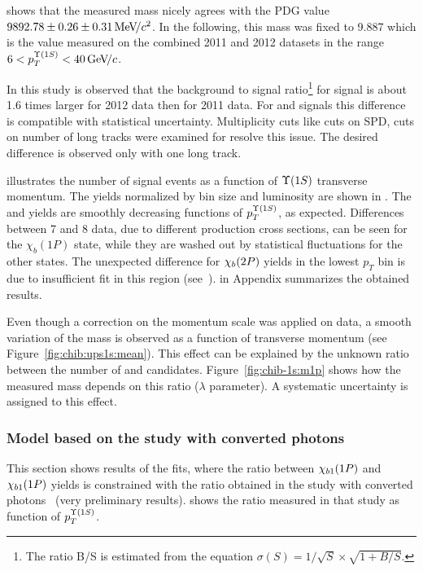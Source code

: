  shows that the measured \chiboneOneP mass
nicely agrees with the PDG value $9892.78 \pm 0.26 \pm 0.31 {\mathrm{\,Me\kern -0.1em V\!/}c^2}$. In
the following, this mass was fixed to 9.887 \gevcc which is the value 
measured on the combined 2011 and 2012 datasets in the range $6<p_T^{\Y1S}<40\gevc$.

In this study is observed that the background to signal ratio\footnote{ The
ratio B/S is estimated  from the equation $\sigma(S) = 1/\sqrt{S} \times
\sqrt{1 + B/S}$. } for \chibThreeP signal  is about 1.6 times
larger for 2012 data then for 2011 data. For \chibOneP and \chibTwoP signals
this difference is compatible with statistical uncertainty. Multiplicity cuts
like cuts on SPD, cuts on number of long tracks were examined for resolve
this issue. The desired difference is observed only with one long track.



 illustrates the number of signal events as
a function of $\Y1S$ transverse momentum. The yields
normalized by bin size and luminosity are shown in
. The \chibOneP and \chibThreeP yields
are smoothly decreasing functions of $p_T^{\Y1S}$, as expected. Differences between 7 and 8\tev
data, due to different production cross sections, can be seen for the
$\chi_b(1P)$ state, while they are washed out by statistical fluctuations for
the other states. The unexpected difference for $\chi_{b}(2P)$ yields in the lowest
$p_T$ bin is due to insufficient fit in this region (see~).
 in Appendix summarizes the
obtained results.



Even though a correction on the momentum scale was applied on data, a smooth variation of the
\chiboneOneP mass is observed as a function of transverse momentum (see
Figure~\ref{fig:chib:ups1s:mean}). This effect can be explained by the unknown
ratio between the number of \chiboneOneP and \chiboneTwoP candidates.
Figure~\ref{fig:chib-1s:m1p} shows how the measured mass depends on this ratio
($\lambda$ parameter). A systematic uncertainty is assigned to this effect.




\subsubsection{Model based on the study with converted photons}
This section shows results of the fits, where the ratio between
$\chi_{b 1}(1P)$ and $\chi_{b 1}(1P)$ yields is constrained with the ratio obtained
in the study with converted photons~\cite{Lespinasse:1664279} (very preliminary
results).  shows the ratio measured in that study as function
of $p_T^{\Y1S}$.

